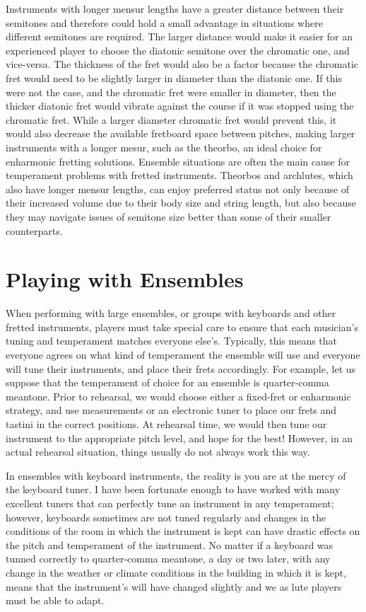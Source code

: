 Instruments with longer mensur lengths have a greater distance between their semitones and therefore
could hold a small advantage in situations where different semitones are required. The larger
distance would make it easier for an experienced player to choose the diatonic semitone over the
chromatic one, and vice-versa. The thickness of the fret would also be a factor because the
chromatic fret would need to be slightly larger in diameter than the diatonic one. If this were not
the case, and the chromatic fret were smaller in diameter, then the thicker diatonic fret would
vibrate against the course if it was stopped using the chromatic fret.  While a larger diameter
chromatic fret would prevent this, it would also decrease the available fretboard space between
pitches, making larger instruments with a longer mesur, such as the theorbo, an ideal choice for
enharmonic fretting solutions.  Ensemble situations are often the main cause for temperament
problems with fretted instruments.  Theorbos and archlutes, which also have longer mensur lengths,
can enjoy preferred status not only because of their increased volume due to their body size and
string length, but also because they may navigate issues of semitone size better than some of their
smaller counterparts.

\section{Playing with Ensembles}

When performing with large ensembles, or groups with keyboards and other fretted instruments,
players must take special care to ensure that each musician's tuning and temperament matches
everyone else's. Typically, this means that everyone agrees on what kind of temperament the ensemble
will use and everyone will tune their instruments, and place their frets accordingly.  For example,
let us suppose that the temperament of choice for an ensemble is quarter-comma meantone.  Prior to
rehearsal, we would choose either a fixed-fret or enharmonic strategy, and use measurements or an
electronic tuner to place our frets and tastini in the correct positions.  At rehearsal time, we
would then tune our instrument to the appropriate pitch level, and hope for the best!  However, in
an actual rehearsal situation, things usually do not always work this way.

In ensembles with keyboard instruments, the reality is you are at the mercy of the keyboard
tuner.  I have been fortunate enough to have worked with many excellent tuners that can perfectly
tune an instrument in any temperament; however, keyboards sometimes are not tuned regularly and
changes in the conditions of the room in which the instrument is kept can have drastic effects
on the pitch and temperament of the instrument.  No matter if a keyboard was tunned correctly to
quarter-comma meantone, a day or two later, with any change in the weather or climate conditions
in the building in which it is kept, means that the instrument's will have changed slightly
and we as lute players must be able to adapt.

